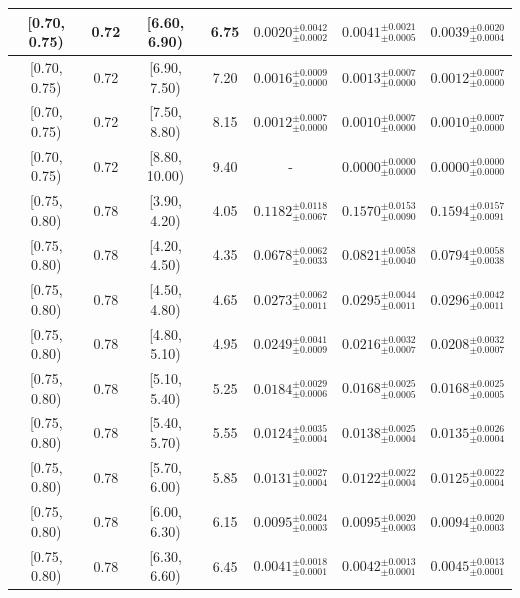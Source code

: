 \begin{longtable}{|c|c|c|c|c|c|c|}
\hline
[0.70, 0.75) & 0.72 & [6.60, 6.90) & 6.75 & $0.0020^{ \pm 0.0042 }_{ \pm 0.0002 }$ & $0.0041^{ \pm 0.0021 }_{ \pm 0.0005 }$ & $0.0039^{ \pm 0.0020 }_{ \pm 0.0004 }$ \\ 
\hline
[0.70, 0.75) & 0.72 & [6.90, 7.50) & 7.20 & $0.0016^{ \pm 0.0009 }_{ \pm 0.0000 }$ & $0.0013^{ \pm 0.0007 }_{ \pm 0.0000 }$ & $0.0012^{ \pm 0.0007 }_{ \pm 0.0000 }$ \\ 
\hline
[0.70, 0.75) & 0.72 & [7.50, 8.80) & 8.15 & $0.0012^{ \pm 0.0007 }_{ \pm 0.0000 }$ & $0.0010^{ \pm 0.0007 }_{ \pm 0.0000 }$ & $0.0010^{ \pm 0.0007 }_{ \pm 0.0000 }$ \\ 
\hline
[0.70, 0.75) & 0.72 & [8.80, 10.00) & 9.40 & - & $0.0000^{ \pm 0.0000 }_{ \pm 0.0000 }$ & $0.0000^{ \pm 0.0000 }_{ \pm 0.0000 }$ \\ 
\hline
[0.75, 0.80) & 0.78 & [3.90, 4.20) & 4.05 & $0.1182^{ \pm 0.0118 }_{ \pm 0.0067 }$ & $0.1570^{ \pm 0.0153 }_{ \pm 0.0090 }$ & $0.1594^{ \pm 0.0157 }_{ \pm 0.0091 }$ \\ 
\hline
[0.75, 0.80) & 0.78 & [4.20, 4.50) & 4.35 & $0.0678^{ \pm 0.0062 }_{ \pm 0.0033 }$ & $0.0821^{ \pm 0.0058 }_{ \pm 0.0040 }$ & $0.0794^{ \pm 0.0058 }_{ \pm 0.0038 }$ \\ 
\hline
[0.75, 0.80) & 0.78 & [4.50, 4.80) & 4.65 & $0.0273^{ \pm 0.0062 }_{ \pm 0.0011 }$ & $0.0295^{ \pm 0.0044 }_{ \pm 0.0011 }$ & $0.0296^{ \pm 0.0042 }_{ \pm 0.0011 }$ \\ 
\hline
[0.75, 0.80) & 0.78 & [4.80, 5.10) & 4.95 & $0.0249^{ \pm 0.0041 }_{ \pm 0.0009 }$ & $0.0216^{ \pm 0.0032 }_{ \pm 0.0007 }$ & $0.0208^{ \pm 0.0032 }_{ \pm 0.0007 }$ \\ 
\hline
[0.75, 0.80) & 0.78 & [5.10, 5.40) & 5.25 & $0.0184^{ \pm 0.0029 }_{ \pm 0.0006 }$ & $0.0168^{ \pm 0.0025 }_{ \pm 0.0005 }$ & $0.0168^{ \pm 0.0025 }_{ \pm 0.0005 }$ \\ 
\hline
[0.75, 0.80) & 0.78 & [5.40, 5.70) & 5.55 & $0.0124^{ \pm 0.0035 }_{ \pm 0.0004 }$ & $0.0138^{ \pm 0.0025 }_{ \pm 0.0004 }$ & $0.0135^{ \pm 0.0026 }_{ \pm 0.0004 }$ \\ 
\hline
[0.75, 0.80) & 0.78 & [5.70, 6.00) & 5.85 & $0.0131^{ \pm 0.0027 }_{ \pm 0.0004 }$ & $0.0122^{ \pm 0.0022 }_{ \pm 0.0004 }$ & $0.0125^{ \pm 0.0022 }_{ \pm 0.0004 }$ \\ 
\hline
[0.75, 0.80) & 0.78 & [6.00, 6.30) & 6.15 & $0.0095^{ \pm 0.0024 }_{ \pm 0.0003 }$ & $0.0095^{ \pm 0.0020 }_{ \pm 0.0003 }$ & $0.0094^{ \pm 0.0020 }_{ \pm 0.0003 }$ \\ 
\hline
[0.75, 0.80) & 0.78 & [6.30, 6.60) & 6.45 & $0.0041^{ \pm 0.0018 }_{ \pm 0.0001 }$ & $0.0042^{ \pm 0.0013 }_{ \pm 0.0001 }$ & $0.0045^{ \pm 0.0013 }_{ \pm 0.0001 }$ \\ 

\end{longtable}
